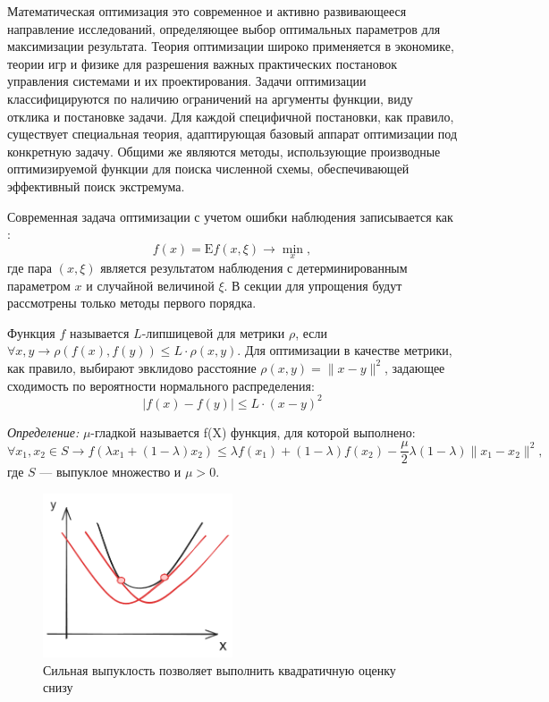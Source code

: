 Математическая оптимизация это современное и активно развивающееся направление исследований, определяющее
выбор оптимальных параметров для максимизации результата. Теория оптимизации широко применяется в экономике,
теории игр и физике для разрешения важных практических постановок управления системами и их проектирования. 
Задачи оптимизации классифицируются по наличию ограничений на аргументы функции, виду отклика и постановке задачи. 
Для каждой специфичной постановки, как правило, существует специальная теория, адаптирующая базовый аппарат 
оптимизации под конкретную задачу. Общими же являются методы, использующие производные оптимизируемой функции для поиска 
численной схемы, обеспечивающей эффективный поиск экстремума.

Современная задача оптимизации с учетом ошибки наблюдения записывается как \cite{nesterov2015universal}:
\begin{equation}
    f(x) = \mathrm{E} f(x,\xi) \rightarrow \min_x,
\end{equation}
где пара $(x,\xi)$ является результатом наблюдения с детерминированным параметром $x$ и случайной величиной $\xi$.
В секции для упрощения будут рассмотрены только методы первого порядка.

 Функция $f$ называется $L$-липшицевой для метрики $\rho$, 
если $\forall x,y \rightarrow \rho(f(x),f(y)) \le L \cdot \rho(x,y)$.
Для оптимизации в качестве метрики, как правило, выбирают эвклидово расстояние $\rho(x,y) =\|x-y \|^2$, задающее 
сходимость по вероятности нормального распределения:   
\begin{equation}
    |f(x) - f(y)| \le L \cdot (x-y)^2
\end{equation}

\textit{Определение:} $\mu$-гладкой называется f(X) функция, для которой выполнено:
\begin{equation}
   \forall x_1,x_2 \in S \rightarrow f(\lambda x_1 + (1-\lambda)x_2) \le \lambda f(x_1) + (1-\lambda) f(x_2) - \frac{\mu}{2} \lambda (1-\lambda) \| x_1 - x_2 \|^2,
\end{equation}
где $S$ --- выпуклое множество и $\mu > 0$. 

\begin{figure}[h]
    \centering
    \includegraphics[width=0.5\textwidth]{assets/math/optimization/strong_convex.excalidraw.png}
    \caption{Сильная выпуклость позволяет выполнить квадратичную оценку снизу}
    \label{strong_convex}
\end{figure}

